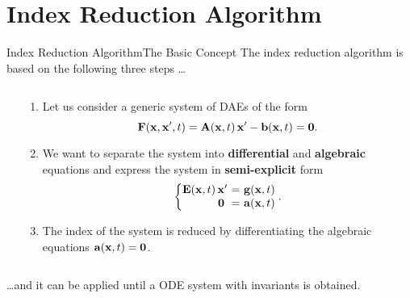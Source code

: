 
\section{Index Reduction Algorithm}

\begin{frame}
  \tableofcontents[currentsection]
\end{frame}

\begin{frame}{Index Reduction Algorithm}{The Basic Concept}
  The index reduction algorithm is based on the following three steps \dots
  \begin{columns}
    \begin{column}[c]{0.2\textwidth}
      \flushright
      \vspace{-2.5em}%
    \end{column}
    \begin{column}[c]{0.85\textwidth}
      \begin{enumerate}
        \item Let us consider a generic system of \acp{DAE} of the form
        \begin{equation*}
          \mathbf{F}(\mathbf{x}, \mathbf{x}^\prime, t) = \mathbf{A}(\mathbf{x}, t) \, \mathbf{x}^\prime - \mathbf{b}(\mathbf{x}, t) = \mathbf{0} \text{.}
        \end{equation*}
        \item We want to separate the system into \textbf{differential} and \textbf{algebraic} equations and express the system in \textbf{semi-explicit} form
        \begin{equation*}
          \left\{\!\!\!\begin{array}{r@{~}c@{~}l}
            \mE \, \mxp &=& \mg \\
            \m{0}\phantom{\prime} &=& \ma
          \end{array}\!\!\!\right. \text{.}
        \end{equation*}
        \item The index of the system is reduced by differentiating the algebraic equations $\mathbf{a}(\mathbf{x}, t) = \mathbf{0}$.
      \end{enumerate}
    \end{column}
  \end{columns}
  \vspace{0.75em}
  \dots and it can be applied until a \acs{ODE} system with invariants is obtained.
\end{frame}

